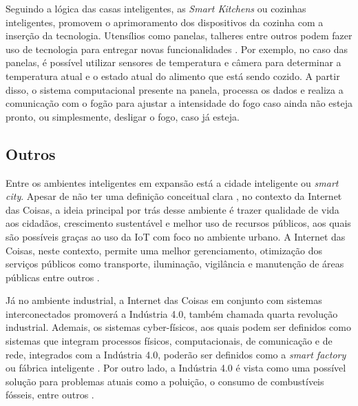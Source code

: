 Seguindo a lógica das casas inteligentes, as \textit{Smart Kitchens} ou cozinhas inteligentes, promovem o aprimoramento dos dispositivos da cozinha com a inserção da tecnologia. Utensílios como panelas, talheres entre outros podem fazer uso de tecnologia para entregar novas funcionalidades \cite{Staender2012}. Por exemplo, no caso das panelas, é possível utilizar sensores de temperatura e câmera para determinar a temperatura atual e o estado atual do alimento que está sendo cozido. A partir disso, o sistema computacional presente na panela, processa os dados e realiza a comunicação com o fogão para ajustar a intensidade do fogo caso ainda não esteja pronto, ou simplesmente, desligar o fogo, caso já esteja. 

\subsection{Outros}

Entre os ambientes inteligentes em expansão está a cidade inteligente ou \textit{smart city}. Apesar de não ter uma definição conceitual clara \cite{Cocchia2014}, no contexto da Internet das Coisas, a ideia principal por trás desse ambiente é trazer qualidade de vida aos cidadãos, crescimento sustentável e melhor uso de recursos públicos, aos quais são possíveis graças ao uso da IoT com foco no ambiente urbano. A Internet das Coisas, neste contexto, permite uma melhor gerenciamento, otimização dos serviços públicos como transporte, iluminação, vigilância e manutenção de áreas públicas entre outros  \cite{Zanella2014}. 

%
Já no ambiente industrial, a Internet das Coisas em conjunto com sistemas interconectados promoverá a Indústria 4.0, também chamada quarta revolução industrial. Ademais, os sistemas cyber-físicos, aos quais podem ser definidos como sistemas que integram processos físicos, computacionais, de comunicação e de rede, integrados com a Indústria 4.0, poderão ser definidos como a \textit{smart factory} ou fábrica inteligente \cite{Lee2015}. Por outro lado, a Indústria 4.0 é vista como uma possível solução para problemas atuais como a poluição, o consumo de combustíveis fósseis, entre outros \cite{Hussain2016}.




